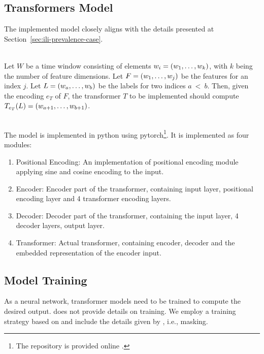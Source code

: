 \documentclass[11pt,a4paper]{article}
\begin{document}
\subsection{Transformers Model}
The implemented model closely aligns with the details presented at Section~\ref{sec:ili-prevalence-case}.

~\\
Let $W$ be a time window consisting of elements $w_i = (w_1,\mathellipsis,w_k)$, with $k$ being the number of feature dimensions.
Let $F =(w_1,\mathellipsis,w_j)$ be the features for an index $j$.
Let $L = (w_a, \mathellipsis, w_b)$ be the labels for two indices $a~<~b$.
Then, given the encoding $e_T$ of $F$, the transformer $T$ to be implemented should compute $T_{e_T}(L) = (w_{a+1},\mathellipsis,w_{b+1})$.

~\\
The model is implemented in python using pytorch\footnote{The repository is provided online \citep{jandeleit_2023_plant_based_transformers}.}. %
It is implemented as four modules:
\begin{enumerate}
    \item Positional Encoding: An implementation of positional encoding module applying sine and cosine encoding to the input.
    \item Encoder: Encoder part of the transformer, containing input layer, positional encoding layer and 4 transformer encoding layers.
    \item Decoder: Decoder part of the transformer, containing the input layer, 4 decoder layers, output layer.
    \item Transformer: Actual transformer, containing encoder, decoder and the embedded representation of the encoder input.
\end{enumerate}

\subsection{Model Training}
As a neural network, transformer models need to be trained to compute the desired output.
\citet{wu_2020} does not provide details on training.
We employ a training strategy based on \citet{Vaswani2017} and include the details given by \citet{wu_2020}, i.e., masking. %
\end{document}
